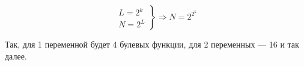\[
    \left.
    \begin{array}{l} L = 2^k \\ N = 2^L \end{array}
    \right\} %
    \Rightarrow N = 2^{2^{k}}
\]


Так, для 1 переменной будет 4 булевых функции, для 2 переменных --- 16 и так далее.


